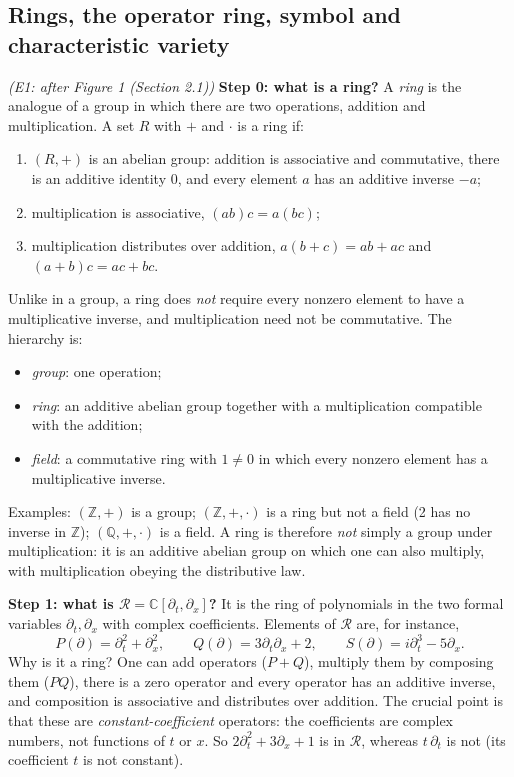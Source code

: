 \documentclass[11pt]{article}
\theoremstyle{plain}
\theoremstyle{definition}
\theoremstyle{remark}
\newcommand{\C}{\mathbb{C}}
\newcommand{\Z}{\mathbb{Z}}
\newcommand{\ring}{\mathcal{R}}            %
\begin{document}
\subsection{Rings, the operator ring, symbol and characteristic variety}\label{expl:E1}
\noindent\emph{(E1: after Figure 1 (Section 2.1))}
\textbf{Step 0: what is a ring?} A \emph{ring} is the analogue of a group in which there are two operations, addition and multiplication. A set $R$ with $+$ and $\cdot$ is a ring if:
\begin{enumerate}[nosep]
\item $(R,+)$ is an abelian group: addition is associative and commutative, there is an additive identity $0$, and every element $a$ has an additive inverse $-a$;
\item multiplication is associative, $(ab)c=a(bc)$;
\item multiplication distributes over addition, $a(b+c)=ab+ac$ and $(a+b)c=ac+bc$.
\end{enumerate}
Unlike in a group, a ring does \emph{not} require every nonzero element to have a multiplicative inverse, and multiplication need not be commutative. The hierarchy is:
\begin{itemize}[nosep]
\item \emph{group}: one operation;
\item \emph{ring}: an additive abelian group together with a multiplication compatible with the addition;
\item \emph{field}: a commutative ring with $1\ne0$ in which every nonzero element has a multiplicative inverse.
\end{itemize}
Examples: $(\Z,+)$ is a group; $(\Z,+,\cdot)$ is a ring but not a field (2 has no inverse in $\Z$); $(\mathbb Q,+,\cdot)$ is a field. A ring is therefore \emph{not} simply a group under multiplication: it is an additive abelian group on which one can also multiply, with multiplication obeying the distributive law.

\medskip\textbf{Step 1: what is $\ring=\C[\partial_t,\partial_x]$?} It is the ring of polynomials in the two formal variables $\partial_t,\partial_x$ with complex coefficients. Elements of $\ring$ are, for instance,
\[
P(\partial)=\partial_t^2+\partial_x^2,\qquad Q(\partial)=3\partial_t\partial_x+2,\qquad S(\partial)=i\partial_t^3-5\partial_x .
\]
Why is it a ring? One can add operators ($P+Q$), multiply them by composing them ($PQ$), there is a zero operator and every operator has an additive inverse, and composition is associative and distributes over addition. The crucial point is that these are \emph{constant-coefficient} operators: the coefficients are complex numbers, not functions of $t$ or $x$. So $2\partial_t^2+3\partial_x+1$ is in $\ring$, whereas $t\,\partial_t$ is not (its coefficient $t$ is not constant).
\end{document}
